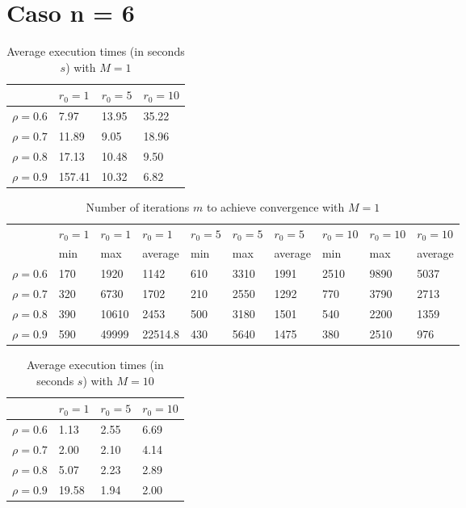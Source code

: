 \documentclass[a4paper,11pt,openright]{report}
\begin{document}
\section*{Caso n = 6} 
\begin{table}[H]
\centering
\addtolength{\leftskip}{-1.5cm}
\addtolength{\rightskip}{-1.5cm}
\begin{tabular}{|c|lll|}
\hline
$ $ & $r_0 = 1$ & $r_0 = 5$ & $r_0 = 10$ \\
\hline
$\rho = 0.6$ & 7.97 & 13.95 & 35.22 \\

$\rho = 0.7$ & 11.89 & 9.05 & 18.96 \\

$\rho = 0.8$ & 17.13 & 10.48 & 9.50 \\

$\rho = 0.9$ & 157.41 & 10.32 & 6.82 \\
\hline
\end{tabular}
\caption{Average execution
 times (in seconds $s$) with $M = 1$}
\end{table}
\begin{table}[H]
\centering
\addtolength{\leftskip}{-1.5cm}
\addtolength{\rightskip}{-1.5cm}
\begin{tabular}{|c|lllllllll|}
\hline
$ $ & $r_0 = 1$ & $r_0 = 1$ & $r_0 = 1$ & $r_0 = 5$ & $r_0 = 5$ & $r_0 = 5$ & $r_0 = 10$ & $r_0 = 10$ & $r_0 = 10$  \\
$ $ & min & max & average & min & max & average & min & max & average \\ 
\hline
$\rho = 0.6$ & 170 & 1920 & 1142 & 610 & 3310 & 1991 & 2510 & 9890 & 5037 \\

$\rho = 0.7$ & 320 & 6730 & 1702 & 210 & 2550 & 1292 & 770 & 3790 & 2713\\

$\rho = 0.8$ & 390 & 10610 & 2453 & 500 & 3180 & 1501 & 540 & 2200 & 1359\\

$\rho = 0.9$ & 590 & 49999 & 22514.8 & 430 & 5640 & 1475 & 380 & 2510 & 976\\
\hline
\end{tabular}
\caption{Number of iterations $m$ to achieve convergence with $M = 1$}
\end{table}
\begin{table}[H]
\centering
\addtolength{\leftskip}{-1.5cm}
\addtolength{\rightskip}{-1.5cm}
\begin{tabular}{|c|lll|}
\hline
$ $ & $r_0 = 1$ & $r_0 = 5$ & $r_0 = 10$ \\
\hline
$\rho = 0.6$ & 1.13 & 2.55 & 6.69 \\

$\rho = 0.7$ & 2.00 & 2.10 & 4.14 \\

$\rho = 0.8$ & 5.07 & 2.23 & 2.89 \\

$\rho = 0.9$ & 19.58 & 1.94 & 2.00 \\
\hline
\end{tabular}
\caption{Average execution
 times (in seconds $s$) with $M = 10$}
\end{table}
\end{document}
